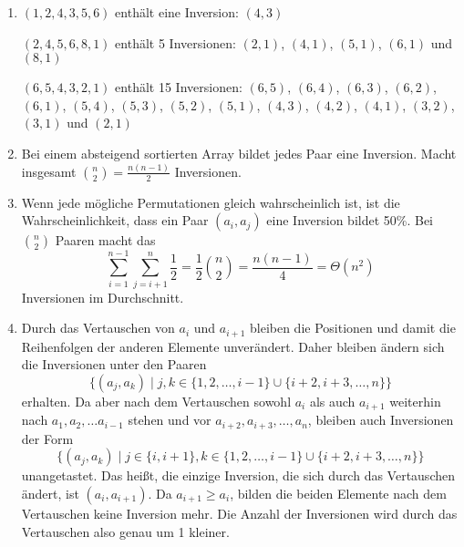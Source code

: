 \documentclass[11pt,a4paper]{article}
\begin{document}
\begin{loesung}
    \begin{enumerate}
        \item $(1, 2, 4, 3, 5, 6)$ enthält eine Inversion: $(4, 3)$ 

        $(2, 4, 5, 6, 8, 1)$ enthält 5 Inversionen: $(2, 1)$, $(4, 1)$, $(5, 1)$, $(6, 1)$ und $(8, 1)$ 

        $(6, 5, 4, 3, 2, 1)$ enthält 15 Inversionen: $(6, 5)$, $(6, 4)$, $(6, 3)$, $(6, 2)$, $(6, 1)$, $(5, 4)$, $(5, 3)$, $(5, 2)$, $(5, 1)$, $(4, 3)$, $(4, 2)$, $(4, 1)$, $(3, 2)$, $(3, 1)$ und $(2, 1)$

        \item Bei einem absteigend sortierten Array bildet jedes Paar eine Inversion. Macht insgesamt $\binom{n}{2} = \frac{n (n - 1)}{2}$ Inversionen.

        \item Wenn jede mögliche Permutationen gleich wahrscheinlich ist, ist die Wahrscheinlichkeit, dass ein Paar $(a_i, a_j)$ eine Inversion bildet 50\%. Bei $\binom{n}{2}$ Paaren macht das 
        \begin{equation*}
            \sum\limits_{i = 1}^{n - 1} \sum\limits_{j = i + 1}^{n} \frac{1}{2} = \frac{1}{2} \binom{n}{2} = \frac{n (n - 1)}{4} = \Theta(n^2)
        \end{equation*}
        Inversionen im Durchschnitt.

        \item 
        Durch das Vertauschen von $a_i$ und $a_{i + 1}$ bleiben die Positionen und damit die Reihenfolgen der anderen Elemente unverändert. Daher bleiben ändern sich die Inversionen unter den Paaren 
        \begin{equation*}
            \{(a_j, a_k) \mid j, k \in \{1, 2, \ldots, i - 1\} \cup \{i + 2, i + 3, \ldots, n\}\}
        \end{equation*}
        erhalten.
        Da aber nach dem Vertauschen sowohl $a_i$ als auch $a_{i + 1}$ weiterhin nach $a_1, a_2, \ldots a_{i - 1}$ stehen und vor $a_{i + 2}, a_{i + 3}, \ldots, a_n$, bleiben auch Inversionen der Form
        \begin{equation*}
            \{(a_j, a_k) \mid j \in \{i, i + 1\}, k \in \{1, 2, \ldots, i - 1\} \cup \{i + 2, i + 3, \ldots, n\}\}
        \end{equation*}
        unangetastet.
        Das heißt, die einzige Inversion, die sich durch das Vertauschen ändert, ist $(a_i, a_{i + 1})$. 
        Da $a_{i + 1} \geq a_i$, bilden die beiden Elemente nach dem Vertauschen keine Inversion mehr.
        Die Anzahl der Inversionen wird durch das Vertauschen also genau um 1 kleiner.


\end{enumerate}
\end{loesung}
\end{document}

